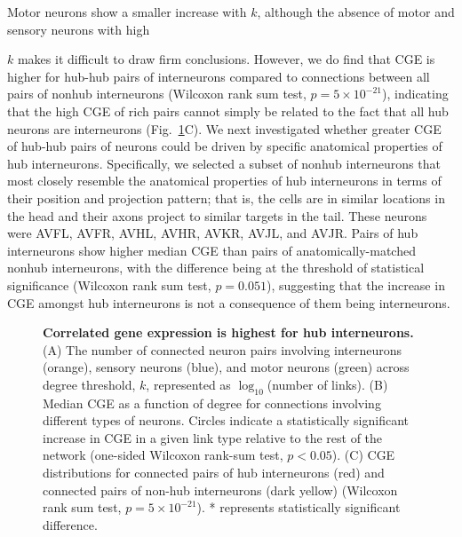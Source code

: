 Motor neurons show a smaller increase with $k$, although the absence of motor and sensory neurons with high {$k$ makes it difficult to draw firm conclusions.
However, we do find that CGE is higher for hub-hub pairs of interneurons compared to connections between all pairs of nonhub interneurons (Wilcoxon rank sum test, $p = 5 \times 10^{-21}$), indicating that the high CGE of rich pairs cannot simply be related to the fact that all hub neurons are interneurons (Fig.~\ref{fig:Ch2Fig7}C).
We next investigated whether greater CGE of hub-hub pairs of neurons could be driven by specific anatomical properties of hub interneurons.
Specifically, we selected a subset of nonhub interneurons that most closely resemble the anatomical properties of hub interneurons in terms of their position and projection pattern; that is, the cells are in similar locations in the head and their axons project to similar targets in the tail. These neurons were AVFL, AVFR, AVHL, AVHR, AVKR, AVJL, and AVJR.
Pairs of hub interneurons show higher median CGE than pairs of anatomically-matched nonhub interneurons, with the difference being at the threshold of statistical significance (Wilcoxon rank sum test, $p = 0.051$), suggesting that the increase in CGE amongst hub interneurons is not a consequence of them being interneurons.

\begin{figure}[!h]
 \caption{
\textbf{Correlated gene expression is highest for hub interneurons.}
(A) The number of connected neuron pairs involving interneurons (orange), sensory neurons (blue), and motor neurons (green) across degree threshold, $k$, represented as $\log_{10}$(number of links).
(B) Median CGE as a function of degree for connections involving different types of neurons.
Circles indicate a statistically significant increase in CGE in a given link type relative to the rest of the network (one-sided Wilcoxon rank-sum test, $p < 0.05$).
(C) CGE distributions for connected pairs of hub interneurons (red) and connected pairs of non-hub interneurons (dark yellow) (Wilcoxon rank sum test, $p = 5 \times 10^{-21}$). * represents statistically significant difference.
}
 \label{fig:Ch2Fig7}
\end{figure}

}
